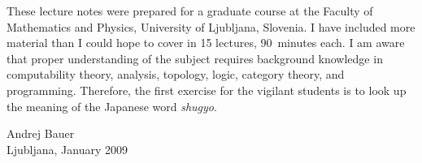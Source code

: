 \documentclass[11pt,a4paper,twoside]{book}
\newcommand{\clearemptydoublepage}{\newpage{\pagestyle{empty}\cleardoublepage}}
\begin{document}
These lecture notes were prepared for a graduate course at the Faculty
of Mathematics and Physics, University of Ljubljana, Slovenia. I have
included more material than I could hope to cover in 15 lectures,
90~minutes each. I am aware that proper understanding of the subject
requires background knowledge in computability theory, analysis,
topology, logic, category theory, and programming. Therefore, the
first exercise for the vigilant students is to look up the meaning of
the Japanese word \emph{shugyo}.


\bigskip

\begin{flushright}
Andrej Bauer\\
Ljubljana, January 2009
\end{flushright}



\clearemptydoublepage

{
\renewcommand{\markboth}[2]{}
\tableofcontents
}







\clearemptydoublepage



{
\renewcommand{\markboth}[2]{}

}

\clearemptydoublepage



{
\renewcommand{\markboth}[2]{}
\printindex
}
\end{document}
